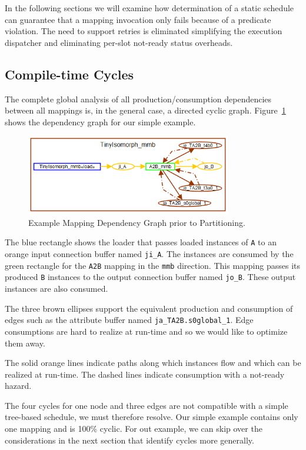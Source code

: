 \documentclass{jot}
\begin{document}
In the following sections we will examine how determination of a static schedule can guarantee that a mapping invocation only fails because of a predicate violation. The need to support retries is eliminated simplifying the execution dispatcher and eliminating per-slot not-ready status overheads.

\subsection{Compile-time Cycles}

The complete global analysis of all production/consumption dependencies between all mappings is, in the general case, a directed cyclic graph. Figure~\ref{fig:TinyIsomorphPrePartition} shows the dependency graph for our simple example.

\begin{figure}[h]
	\centering
	\includegraphics[width=0.8\textwidth]{TinyIsomorphPrePartition.png}
	\caption{Example Mapping Dependency Graph prior to Partitioning.}
	\label{fig:TinyIsomorphPrePartition}
\end{figure}

The blue rectangle shows the loader that passes loaded instances of \verb|A| to an orange input connection buffer named \verb|ji_A|. The instances are consumed by the green rectangle for the \verb|A2B| mapping in the \verb|mmb| direction. This mapping passes its produced \verb|B| instances to the output connection buffer named \verb|jo_B|. These output instances are also consumed.

The three brown ellipses support the equivalent production and consumption of edges such as the attribute buffer named  \verb|ja_TA2B.s0global_1|. Edge consumptions are hard to realize at run-time and so we would like to optimize them away.

The solid orange lines indicate paths along which instances flow and which can be realized at run-time. The dashed lines indicate consumption with a not-ready hazard. 

The four cycles for one node and three edges are not compatible with a simple tree-based schedule, we must therefore resolve. Our simple example contains only one mapping and is 100\% cyclic. For out example, we can skip over the considerations in the next section that identify cycles more generally.
\end{document}
